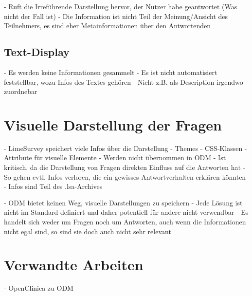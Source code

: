 - Ruft die Irreführende Darstellung hervor, der Nutzer habe geantwortet (Was nicht der Fall ist)
- Die Information ist nicht Teil der Meinung/Ansicht des Teilnehmers, es sind eher Metainformationen über den Antwortenden

\subsection{Text-Display}

- Es werden keine Informationen gesammelt
- Es ist nicht automatisiert feststellbar, wozu Infos des Textes gehören
	- Nicht z.B. als Description irgendwo zuordnebar

\section{Visuelle Darstellung der Fragen}

- LimeSurvey speichert viele Infos über die Darstellung
	- Themes
	- CSS-Klassen
	- Attribute für visuelle Elemente
- Werden nicht übernommen in ODM
- Ist kritisch, da die Darstellung von Fragen direkten Einfluss auf die Antworten hat
	- So gehen evtl. Infos verloren, die ein gewisses Antwortverhalten erklären könnten
- Infos sind Teil des .lsa-Archives

- ODM bietet keinen Weg, visuelle Darstellungen zu speichern
	- Jede Lösung ist nicht im Standard definiert und daher potentiell für andere nicht verwendbar
	- Es handelt sich weder um Fragen noch um Antworten, auch wenn die Informationen nicht egal sind, so sind sie doch auch nicht sehr relevant

\section{Verwandte Arbeiten}

- OpenClinica zu ODM
